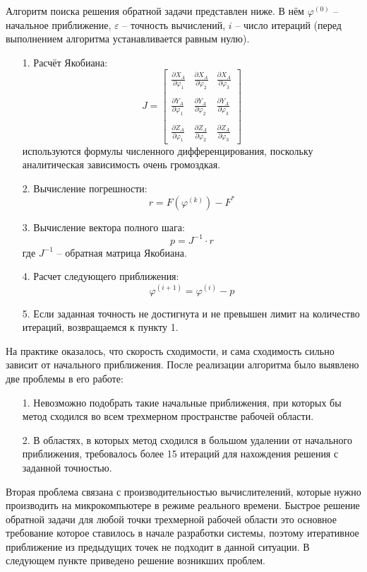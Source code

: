 Алгоритм поиска решения обратной задачи представлен ниже. В нём $ \varphi^{(0)} $ -- начальное приближение, $ \varepsilon $ -- точность вычислений, $ i $ -- число итераций (перед выполнением алгоритма устанавливается равным нулю).
\begin{itemize}
    \item[1.] Расчёт Якобиана: $$ J = \begin{bmatrix}
        \frac{\partial X_A}{\partial \varphi_1} & 
        \frac{\partial X_A}{\partial \varphi_2} & 
        \frac{\partial X_A}{\partial \varphi_3} \\ \\
        \frac{\partial Y_A}{\partial \varphi_1} & 
        \frac{\partial Y_A}{\partial \varphi_2} & 
        \frac{\partial Y_A}{\partial \varphi_3} \\ \\
        \frac{\partial Z_A}{\partial \varphi_1} & 
        \frac{\partial Z_A}{\partial \varphi_2} & 
        \frac{\partial Z_A}{\partial \varphi_3}
    \end{bmatrix} $$ используются формулы численного дифференцирования, поскольку аналитическая зависимость очень громоздкая.
    \item[2.] Вычисление погрешности: $$ r=F(\varphi^{(k)})-F^* $$
    \item[3.] Вычисление вектора полного шага: $$ p = J^{-1} \cdot r $$ где $ J^{-1} $ -- обратная матрица Якобиана.
    \item[4.] Расчет следующего приближения: $$ \varphi^{(i+1)}=\varphi^{(i)} - p $$ 
    \item[5.] Если заданная точность не достигнута и не превышен лимит на количество итераций, возвращаемся к пункту 1.
\end{itemize}

\noindent На практике оказалось, что скорость сходимости, и сама сходимость сильно зависит от начального приближения. После реализации алгоритма было выявлено две проблемы в его работе:
\begin{itemize}
    \item[1.] Невозможно подобрать такие начальные приближения, при которых бы метод сходился во всем трехмерном пространстве рабочей области.
    \item[2.] В областях, в которых метод сходился в большом удалении от начального приближения, требовалось более 15 итераций для нахождения решения с заданной точностью.
\end{itemize}

\noindent Вторая проблема связана с производительностью вычислителений, которые нужно производить на микрокомпьютере в режиме реального времени. Быстрое решение обратной задачи для любой точки трехмерной рабочей области это основное требование которое ставилось в начале разработки системы, поэтому итеративное приближение из предыдущих точек не  подходит в данной ситуации. В следующем пункте приведено решение возникших проблем.

